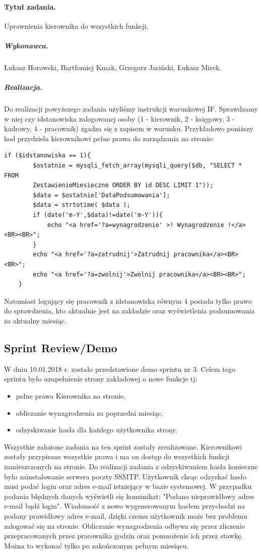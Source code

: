\documentclass[a4paper]{article}
\begin{document}
\paragraph{Tytuł zadania.} Uprawnienia kierownika do wszystkich funkcji.
\subparagraph{Wykonawca.} Łukasz Horowski, Bartłomiej Kmak, Grzegorz Jasiński, Łukasz Mirek.
\subparagraph{Realizacja.}  Do realizacji powyższego zadania użyliśmy instrukcji warunkowej IF. Sprawdzamy w niej czy idstanowiska zalogowanej osoby (1 - kierownik, 2 - księgowy, 3 - kadrowy, 4 - pracownik) zgadza się z zapisem w warunku. Przykładowo poniższy kod przydziela kierownikowi pełne prawa do zarządzania na stronie: 
\begin{verbatim}
if ($idstanowiska == 1){
		$ostatnie = mysqli_fetch_array(mysqli_query($db, "SELECT * FROM
		ZestawienieMiesieczne ORDER BY id DESC LIMIT 1"));
		$data = $ostatnie['DataPodsumowania'];
		$data = strtotime( $data );
		if (date('m-Y',$data)!=date('m-Y')){		
			echo "<a href='?a=wynagrodzenie' >! Wynagrodzenie !</a><BR><BR>";
		}
		echo "<a href='?a=zatrudnij'>Zatrudnij pracownika</a><BR><BR>";
		echo "<a href='?a=zwolnij'>Zwolnij pracownika</a><BR><BR>";
	}
\end{verbatim}
Natomiast logujący się pracownik z idstanowiska równym 4 posiada tylko prawo do sprawdzenia, kto aktualnie jest na zakładzie oraz wyświetlenia podsumowania za aktualny miesiąc. 


\subsection{Sprint Review/Demo}
W dniu 10.01.2018 r. zostało przedstawione demo sprintu nr 3. Celem tego sprintu było uzupełnienie strony zakładowej o nowe funkcje tj:
\begin{itemize}
	\item pełne prawa Kierownika na stronie,
	\item obliczanie wynagrodzenia za poprzedni miesiąc,
	\item odzyskiwanie hasła dla każdego użytkownika strony.
\end{itemize}
Wszystkie założone zadania na ten sprint zostały zrealizowane. Kierownikowi zostały przypisane wszystkie prawa i ma on dostęp do wszystkich funkcji zamieszczonych na stronie.
Do realizacji zadania z odzyskiwaniem hasła konieczne było zainstalowanie serwera poczty SSMTP. Użytkownik chcąc odzyskać hasło musi podać login oraz adres e-mail istniejący w bazie systemowej. W przypadku podania błędnych danych wyświetli się komunikat: "Podano nieprawidłowy adres e-mail bądź login". Wiadomość z nowo wygenerowanym hasłem przychodzi na podany prawidłowy adres e-mail, dzięki czemu użytkownik może bez problemu zalogować się na stronie.
Obliczanie wynagrodzenia odbywa się przez zliczenie przepracowanych przez pracownika godzin  oraz pomnożenie ich przez stawkę. Można to wykonać tylko po zakończonym pełnym miesiącu.
\end{document}
